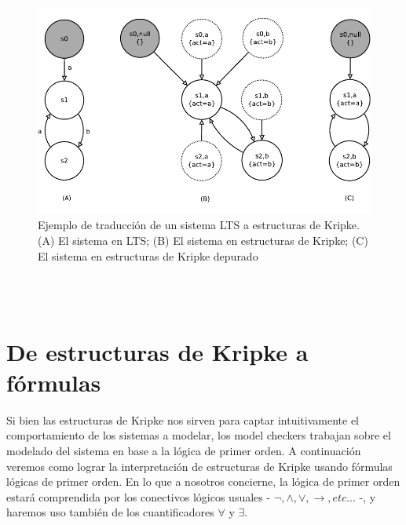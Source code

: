 \documentclass[titlepage, 12pt]{book}
\begin{document}
\begin{figure}[H]
  \centering
    \includegraphics{Imagenes/ltsakripke.pdf}
  \caption{Ejemplo de traducci\'on de un sistema LTS a estructuras de Kripke. (A) El sistema en LTS; (B) El sistema en estructuras de Kripke; (C) El sistema en estructuras de Kripke depurado}
  \label{ltsakripke}
\end{figure}
~\\\\






\section{De estructuras de Kripke a f\'ormulas }
Si bien las estructuras de Kripke nos sirven para captar intuitivamente el comportamiento de los sistemas a modelar, los model checkers trabajan sobre el modelado del sistema en base a la l\'ogica de primer orden. A continuaci\'on veremos como lograr la interpretaci\'on de estructuras de Kripke usando f\'ormulas l\'ogicas de primer orden. En lo que a nosotros concierne, la l\'ogica de primer orden estar\'a comprendida por los conectivos l\'ogicos usuales - $\neg,\wedge,\vee,\rightarrow,etc...$ -, y haremos uso tambi\'en de los cuantificadores $\forall$ y $\exists$.\\
\end{document}
